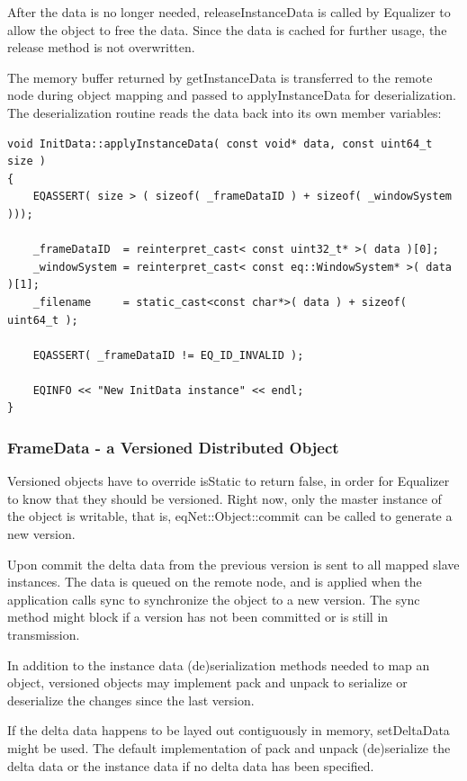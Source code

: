 \documentclass[10pt,a4]{scrartcl}
\begin{document}
After the data is no longer needed, \textsf{releaseInstanceData} is
called by Equalizer to allow the object to free the data. Since the data
is cached for further usage, the release method is not overwritten.

The memory buffer returned by \textsf{getInstanceData} is transferred to
the remote node during object mapping and passed to
\textsf{applyInstanceData} for deserialization. The deserialization
routine reads the data back into its own member variables:

{\footnotesize\begin{lstlisting}
void InitData::applyInstanceData( const void* data, const uint64_t size )
{
    EQASSERT( size > ( sizeof( _frameDataID ) + sizeof( _windowSystem )));

    _frameDataID  = reinterpret_cast< const uint32_t* >( data )[0];
    _windowSystem = reinterpret_cast< const eq::WindowSystem* >( data )[1];
    _filename     = static_cast<const char*>( data ) + sizeof( uint64_t );

    EQASSERT( _frameDataID != EQ_ID_INVALID );

    EQINFO << "New InitData instance" << endl;
}
\end{lstlisting}}%

\subsubsection{FrameData - a Versioned Distributed Object}

Versioned objects have to override \textsf{isStatic} to return false, in
order for Equalizer to know that they should be versioned. Right now,
only the master instance of the object is writable, that is,
\textsf{eqNet::Object::commit} can be called to generate a new
version. 

Upon \textsf{commit} the delta data from the previous version is sent to
all mapped slave instances. The data is queued on the remote node, and
is applied when the application calls \textsf{sync} to synchronize the
object to a new version. The \textsf{sync} method might block if a
version has not been committed or is still in transmission.

In addition to the instance data (de)serialization methods needed to map
an object, versioned objects may implement \textsf{pack} and
\textsf{unpack} to serialize or deserialize the changes since the last
version.

If the delta data happens to be layed out contiguously in memory,
\textsf{setDeltaData} might be used. The default implementation of
\textsf{pack} and \textsf{unpack} (de)serialize the delta data or the
instance data if no delta data has been specified.
\end{document}
